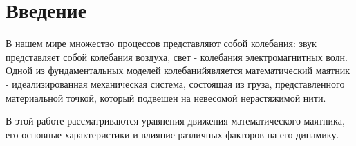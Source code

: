 \section{Введение}
В нашем мире множество процессов представляют собой колебания: 
звук представляет собой колебания воздуха, свет - колебания электромагнитных волн. 
Одной из фундаментальных моделей  колебанийявляется математический маятник - идеализированная механическая система, состоящая из груза, представленного материальной точкой, который подвешен на невесомой нерастяжимой нити.

В этой работе рассматриваются уравнения движения математического маятника, его основные характеристики и влияние различных факторов на его динамику.